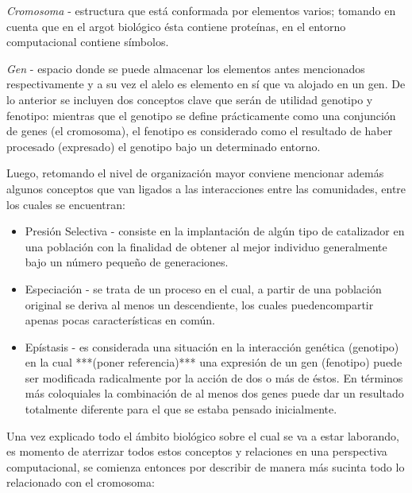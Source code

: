 \documentclass[class=report, crop=false]{standalone}
\begin{document}
\begin{definition}
\textit{Cromosoma} - estructura que está conformada por elementos 
varios; tomando en cuenta que en el argot biológico ésta contiene 
proteínas, en el entorno computacional contiene símbolos.
\end{definition}

\begin{definition} 
\textit{Gen} - espacio donde se puede almacenar los elementos antes mencionados respectivamente 
y a su vez el alelo es elemento en sí que va alojado en un gen.\medskip\break  
De lo anterior se incluyen dos conceptos clave que serán de utilidad 
genotipo y fenotipo: mientras que el genotipo se define prácticamente 
como una conjunción de genes (el cromosoma), el fenotipo es considerado 
como el resultado de haber procesado (expresado) el genotipo bajo un 
determinado entorno.
\end{definition}

\begin{definition}
\end{definition}


Luego, retomando el nivel de organización mayor conviene 
mencionar además algunos conceptos que van ligados a las 
interacciones entre las comunidades, entre los cuales se encuentran:

\begin{itemize}
\item Presión Selectiva - consiste en la implantación de algún 
tipo de catalizador en una población con la finalidad de obtener al 
mejor individuo generalmente bajo un número pequeño de generaciones. 
\item Especiación - se trata de un proceso en el cual, a partir de 
una población original se deriva al menos un descendiente, los cuales 
puedencompartir apenas pocas características en común. 
\item Epístasis - es considerada una situación en la interacción 
genética (genotipo) en la cual ***(poner referencia)*** una expresión 
de un gen (fenotipo) puede ser modificada radicalmente por la acción 
de dos o más de éstos. En términos más coloquiales la combinación de 
al menos dos genes puede dar un resultado totalmente diferente para 
el que se estaba pensado inicialmente. 
\end{itemize}

Una vez explicado todo el ámbito biológico sobre el cual se va a 
estar laborando, es momento de aterrizar todos estos conceptos 
y relaciones en una perspectiva computacional, se comienza entonces 
por describir de manera más sucinta todo lo relacionado con el 
cromosoma:
\end{document}
